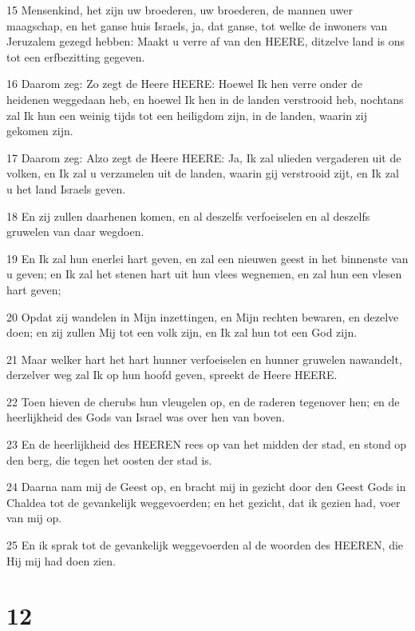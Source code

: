 \par 15 Mensenkind, het zijn uw broederen, uw broederen, de mannen uwer maagschap, en het ganse huis Israels, ja, dat ganse, tot welke de inwoners van Jeruzalem gezegd hebben: Maakt u verre af van den HEERE, ditzelve land is ons tot een erfbezitting gegeven.
\par 16 Daarom zeg: Zo zegt de Heere HEERE: Hoewel Ik hen verre onder de heidenen weggedaan heb, en hoewel Ik hen in de landen verstrooid heb, nochtans zal Ik hun een weinig tijds tot een heiligdom zijn, in de landen, waarin zij gekomen zijn.
\par 17 Daarom zeg: Alzo zegt de Heere HEERE: Ja, Ik zal ulieden vergaderen uit de volken, en Ik zal u verzamelen uit de landen, waarin gij verstrooid zijt, en Ik zal u het land Israels geven.
\par 18 En zij zullen daarhenen komen, en al deszelfs verfoeiselen en al deszelfs gruwelen van daar wegdoen.
\par 19 En Ik zal hun enerlei hart geven, en zal een nieuwen geest in het binnenste van u geven; en Ik zal het stenen hart uit hun vlees wegnemen, en zal hun een vlesen hart geven;
\par 20 Opdat zij wandelen in Mijn inzettingen, en Mijn rechten bewaren, en dezelve doen; en zij zullen Mij tot een volk zijn, en Ik zal hun tot een God zijn.
\par 21 Maar welker hart het hart hunner verfoeiselen en hunner gruwelen nawandelt, derzelver weg zal Ik op hun hoofd geven, spreekt de Heere HEERE.
\par 22 Toen hieven de cherubs hun vleugelen op, en de raderen tegenover hen; en de heerlijkheid des Gods van Israel was over hen van boven.
\par 23 En de heerlijkheid des HEEREN rees op van het midden der stad, en stond op den berg, die tegen het oosten der stad is.
\par 24 Daarna nam mij de Geest op, en bracht mij in gezicht door den Geest Gods in Chaldea tot de gevankelijk weggevoerden; en het gezicht, dat ik gezien had, voer van mij op.
\par 25 En ik sprak tot de gevankelijk weggevoerden al de woorden des HEEREN, die Hij mij had doen zien.

\chapter{12}

